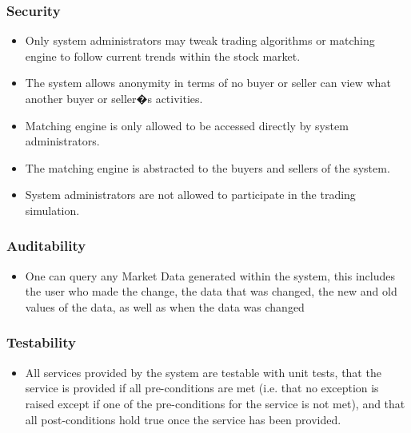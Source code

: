 \documentclass[12pt]{article}
\begin{document}
			    	\subsubsection{Security}
			    	\begin{itemize}
			    		\item Only system administrators may tweak trading algorithms or matching engine to follow current trends within the stock market.
                                        \item The system allows anonymity in terms of no buyer or seller can view what another buyer or seller�s activities.
                                        \item Matching engine is only allowed to be accessed directly by system administrators. 
                                        \item The matching engine is abstracted to the buyers and sellers of the system. 
                                        \item System administrators are not allowed to participate in the trading simulation.
			    	\end{itemize}	
			    		
			    	\subsubsection{Auditability}
			    	\begin{itemize}
				    	\item One can query any Market Data generated within the system, this includes the user who made the change, the data that was changed, the new and old values of the data, as well as when the data was changed
			    	\end{itemize}
			    	
			    	\subsubsection{Testability}
			    	\begin{itemize}
			    		\item All services provided by the system are testable with unit tests, that the service is provided if all pre-conditions are met (i.e. that no exception is raised except if one of the pre-conditions for the service is not met), and that all post-conditions hold true once the service has been provided.
			    	\end{itemize}
			    
\end{document}
